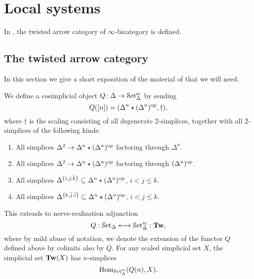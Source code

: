 \documentclass[main.tex]{subfiles}
\begin{document}
\section{Local systems}
\label{sec:local_systems}

In \cite{garcia2020enhanced}, the twisted arrow category of $\infty$-bicategory is defined. 

\subsection{The twisted arrow category}
\label{ssc:the_twisted_arrow_category}

In this section we give a short exposition of the material of \cite{garcia2020enhanced} that we will need.

We define a cosimplicial object $Q\colon \Delta \to \mathcal{S}\mathrm{et}_{\Delta}^{\mathrm{sc}}$ by sending
\begin{equation*}
  Q([n]) = (\Delta^{n} \star (\Delta^{n})^{\mathrm{op}}, \dagger),
\end{equation*}
where $\dagger$ is the scaling consisting of all degenerate 2-simplices, together with all 2-simplices of the following kinds:
\begin{enumerate}
  \item All simplices $\Delta^{2} \to \Delta^{n} \star (\Delta^{n})^{\mathrm{op}}$ factoring through $\Delta^{n}$.

  \item All simplices $\Delta^{2} \to \Delta^{n} \star (\Delta^{n})^{\mathrm{op}}$ factoring through $(\Delta^{n})^{\mathrm{op}}$.

  \item All simplices $\Delta^{\{i, j, \bar{k}\}} \subseteq \Delta^{n} \star (\Delta^{n})^{\mathrm{op}}$, $i < j \leq k$.

  \item All simplices $\Delta^{\{k, \bar{j}, \bar{i}\}} \subseteq \Delta^{n} \star (\Delta^{n})^{\mathrm{op}}$, $i < j \leq k$.
\end{enumerate}

This extends to nerve-realization adjunction
\begin{equation*}
  Q : \mathcal{S}\mathrm{et}_{\Delta} \longleftrightarrow \mathcal{S}\mathrm{et}_{\Delta}^{\mathrm{sc}} : \mathbf{Tw},
\end{equation*}
where by mild abuse of notation, we denote the extension of the functor $Q$ defined above by colimits also by $Q$. For any scaled simplicial set $X$, the simplicial set $\mathbf{Tw}(X)$ has $n$-simplices
\begin{equation*}
  \mathrm{Hom}_{\mathcal{S}\mathrm{et}_{\Delta}^{\mathrm{sc}}}(Q(n), X).
\end{equation*}
\end{document}
